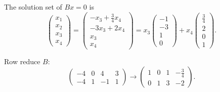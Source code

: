 \documentclass{ximera}
\begin{document}
\ans The solution set of $Bx = 0$ is
\[
\left(\begin{array}{r} x_1 \\ x_2 \\ x_3 \\ x_4 \end{array}\right)
= \left(\begin{array}{c} -x_3 + \frac{3}{4}x_4 \\ -3x_3 + 2x_4 \\
x_3 \\ x_4 \end{array}\right) = x_3\left(\begin{array}{r} -1 \\ -3 \\
1 \\ 0 \end{array}\right) + x_4\left(\begin{array}{r} \frac{3}{4} \\
2 \\ 0 \\ 1 \end{array}\right).
\]

\soln Row reduce $B$:
\[
\left(\begin{array}{rrrr} -4 & 0 & 4 & 3 \\ -4 & 1 & -1 & 1
\end{array}\right) \longrightarrow \left(\begin{array}{rrrr}
1 & 0 & 1 & -\frac{3}{4} \\ 0 & 1 & 3 & -2 \end{array}\right).
\]
\end{document}
